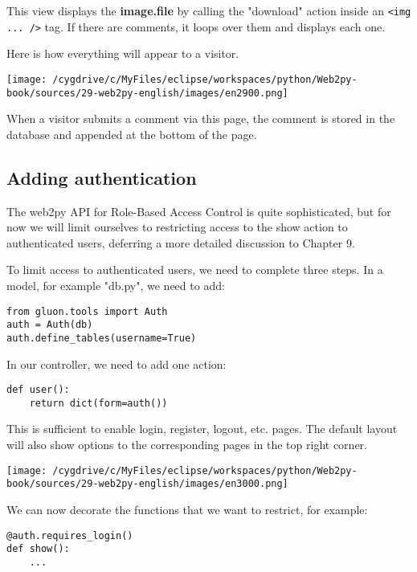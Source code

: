 \documentclass[justified,sixbynine,notoc]{tufte-book}
\def\ft{\small\tt}
\begin{document}
\begin{fullwidth}
This view displays the {\bf image.file} by calling the "download" action inside an {\ft <img ... />} tag.
If there are comments, it loops over them and displays each one.

Here is how everything will appear to a visitor.


\goodbreak\begin{center}\texttt{[image: /cygdrive/c/MyFiles/eclipse/workspaces/python/Web2py-book/sources/29-web2py-english/images/en2900.png]}\end{center}


When a visitor submits a comment via this page, the comment is stored in the database and appended at the bottom of the page.

\goodbreak\subsection{Adding authentication}

The web2py API for Role-Based Access Control is quite sophisticated, but for now we will limit ourselves to restricting access to the show action to authenticated users, deferring a more detailed discussion to Chapter 9.

To limit access to authenticated users, we need to complete three steps. In a model, for example "db.py", we need to add:
\begin{lstlisting}
from gluon.tools import Auth
auth = Auth(db)
auth.define_tables(username=True)
\end{lstlisting}

In our controller, we need to add one action:
\begin{lstlisting}
def user():
    return dict(form=auth())
\end{lstlisting}

This is sufficient to enable login, register, logout, etc. pages. The default layout will also show options to the corresponding pages in the top right corner.


\goodbreak\begin{center}\texttt{[image: /cygdrive/c/MyFiles/eclipse/workspaces/python/Web2py-book/sources/29-web2py-english/images/en3000.png]}\end{center}


We can now decorate the functions that we want to restrict, for example:
\begin{lstlisting}
@auth.requires_login()
def show():
    ...
\end{lstlisting}


\end{fullwidth}
\end{document}
